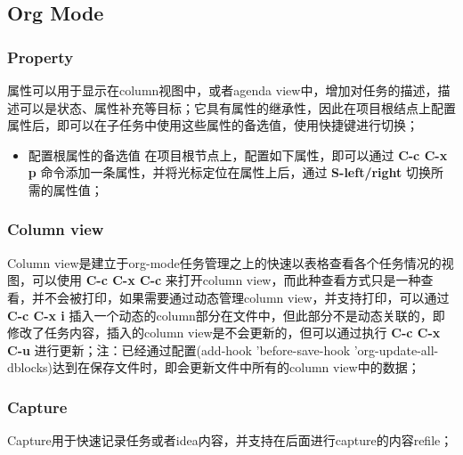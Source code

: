 \documentclass[10pt,a4paper]{article}
\begin{document}
\subsection{Org Mode}
\label{sec-2-2}
\subsubsection{Property}
\label{sec-2-2-1}
属性可以用于显示在column视图中，或者agenda view中，增加对任务的描述，描述可以是状态、属性补充等目标；它具有属性的继承性，因此在项目根结点上配置属性后，即可以在子任务中使用这些属性的备选值，使用快捷键进行切换；
\begin{itemize}
\item 配置根属性的备选值
在项目根节点上，配置如下属性，即可以通过 \textbf{C-c C-x p} 命令添加一条属性，并将光标定位在属性上后，通过 \textbf{S-left/right} 切换所需的属性值；
\end{itemize}
\subsubsection{Column view}
\label{sec-2-2-2}
Column view是建立于org-mode任务管理之上的快速以表格查看各个任务情况的视图，可以使用 \textbf{C-c C-x C-c} 来打开column view，而此种查看方式只是一种查看，并不会被打印，如果需要通过动态管理column view，并支持打印，可以通过 \textbf{C-c C-x i} 插入一个动态的column部分在文件中，但此部分不是动态关联的，即修改了任务内容，插入的column view是不会更新的，但可以通过执行 \textbf{C-c C-x C-u} 进行更新；注：已经通过配置(add-hook 'before-save-hook 'org-update-all-dblocks)达到在保存文件时，即会更新文件中所有的column view中的数据；
\subsubsection{Capture}
\label{sec-2-2-3}
Capture用于快速记录任务或者idea内容，并支持在后面进行capture的内容refile；
\end{document}
